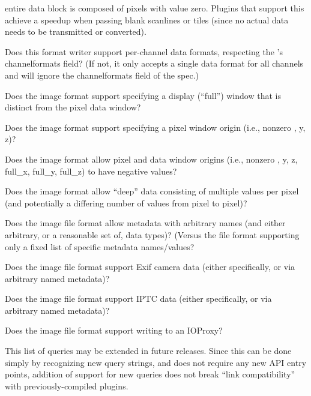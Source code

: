 \begin{description}
  entire data block is composed of pixels with value zero.  Plugins
  that support this achieve a speedup when passing blank scanlines or
  tiles (since no actual data needs to be transmitted or converted).
\item[\rm \qkw{channelformats}] Does this format writer support per-channel
  data formats, respecting the \ImageSpec's {\cf channelformats}
  field?  (If not, it only accepts a single data format for all
  channels and will ignore the {\cf channelformats} field of the spec.)
\item[\rm \qkw{displaywindow}] Does the image format support specifying
  a display (``full'') window that is distinct from the pixel data
  window?
\item[\rm \qkw{origin}] Does the image format support specifying
  a pixel window origin (i.e., nonzero , {\cf y},
  {\cf z})?
\item[\rm \qkw{negativeorigin}] Does the image format allow pixel
  and data window origins (i.e., nonzero , {\cf y},
  {\cf z}, {\cf full_x}, {\cf full_y}, {\cf full_z}) to have
  negative values?
\item[\rm \qkw{deepdata}] Does the image format allow ``deep'' data
  consisting of multiple values per pixel (and potentially a differing
  number of values from pixel to pixel)?
\item[\rm \qkw{arbitrary_metadata}] Does the image file format allow
  metadata with arbitrary names (and either arbitrary, or a reasonable set
  of, data types)? (Versus the file format supporting only a fixed list of
  specific metadata names/values?
\item[\rm \qkw{exif}] Does the image file format support Exif camera data
  (either specifically, or via arbitrary named metadata)?
\item[\rm \qkw{iptc}] Does the image file format support IPTC data
  (either specifically, or via arbitrary named metadata)?
\item[\rm \qkw{ioproxy}] Does the image file format support writing
  to an {\cf IOProxy}?
\end{description}

\noindent This list of queries may be extended in future releases.
Since this can be done simply by recognizing new query strings, and does
not require any new API entry points, addition of support for new
queries does not break ``link compatibility'' with previously-compiled
plugins.
\apiend

\label{sec:imageoutputopen}

